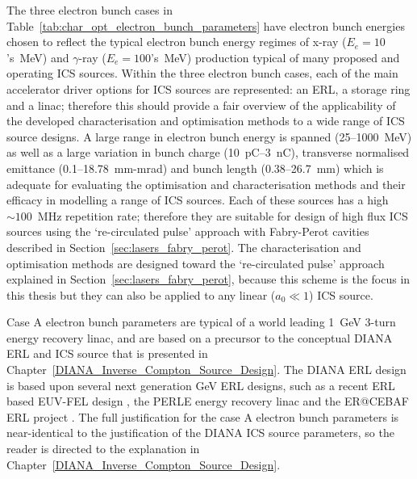 \documentclass[../main.tex]{subfiles}
\begin{document}
The three electron bunch cases in Table~\ref{tab:char_opt_electron_bunch_parameters} have electron bunch energies chosen to reflect the typical electron bunch energy regimes of x-ray ($E_{e} = 10$'s~\si{\mega\electronvolt}) and $\gamma$-ray ($E_{e} =100$'s~\si{\mega\electronvolt}) production typical of many proposed and operating ICS sources. Within the three electron bunch cases, each of the main accelerator driver options for ICS sources are represented: an ERL, a storage ring and a linac; therefore this should provide a fair overview of the applicability of the developed characterisation and optimisation methods to a wide range of ICS source designs. A large range in electron bunch energy is spanned (25--1000~\si{\mega\electronvolt}) as well as a large variation in bunch charge (10~\si{\pico\coulomb}--3~\si{\nano\coulomb}), transverse normalised emittance (0.1--18.78~\si{\milli\meter}-\si{\milli\radian}) and bunch length (0.38--26.7~\si{\milli\meter}) which is adequate for evaluating the optimisation and characterisation methods and their efficacy in modelling a range of ICS sources. Each of these sources has a high $\sim100$~\si{\mega\hertz} repetition rate; therefore they are suitable for design of high flux ICS sources using the `re-circulated pulse' approach with Fabry-Perot cavities described in Section~\ref{sec:lasers_fabry_perot}. The characterisation and optimisation methods are designed toward the `re-circulated pulse' approach explained in Section~\ref{sec:lasers_fabry_perot}, because this scheme is the focus in this thesis but they can also be applied to any linear ($a_{0}\ll 1$) ICS source. 

Case A electron bunch parameters are typical of a world leading 1~\si{\giga\electronvolt} 3-turn energy recovery linac, and are based on a precursor to the conceptual DIANA ERL and ICS source that is presented in Chapter~\ref{DIANA_Inverse_Compton_Source_Design}. The DIANA ERL design is based upon several next generation \si{\giga\electronvolt} ERL designs, such as a recent ERL based EUV-FEL design \cite{akkermans2017compact}, the PERLE energy recovery linac \cite{angal2018perle} and the ER@CEBAF ERL project \cite{meot2016er,bogacz2016er}. The full justification for the case A electron bunch parameters is near-identical to the justification of the DIANA ICS source parameters, so the reader is directed to the explanation in Chapter~\ref{DIANA_Inverse_Compton_Source_Design}.      
\end{document}
